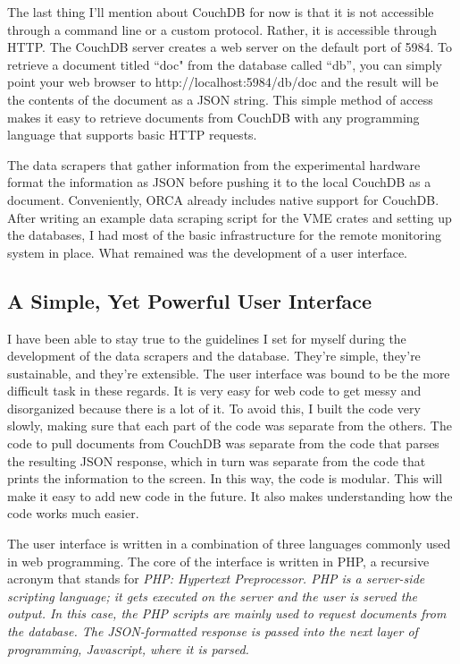 		The last thing I'll mention about CouchDB for now is that it is not accessible through a command line or a custom protocol. Rather, it is accessible through HTTP. The CouchDB server creates a web server on the default port of 5984. To retrieve a document titled ``doc" from the database called ``db'', you can simply point your web browser to http://localhost:5984/db/doc and the result will be the contents of the document as a JSON string. This simple method of access makes it easy to retrieve documents from CouchDB with any programming language that supports basic HTTP requests. 

		The data scrapers that gather information from the experimental hardware format the information as JSON before pushing it to the local CouchDB as a document. Conveniently, ORCA already includes native support for CouchDB. After writing an example data scraping script for the VME crates and setting up the databases, I had most of the basic infrastructure for the remote monitoring system in place. What remained was the development of a user interface.

		\subsection{A Simple, Yet Powerful User Interface}
		I have been able to stay true to the guidelines I set for myself during the development of the data scrapers and the database. They're simple, they're sustainable, and they're extensible. The user interface was bound to be the more difficult task in these regards. It is very easy for web code to get messy and disorganized because there is a lot of it. To avoid this, I built the code very slowly, making sure that each part of the code was separate from the others. The code to pull documents from CouchDB was separate from the code that parses the resulting JSON response, which in turn was separate from the code that prints the information to the screen. In this way, the code is modular. This will make it easy to add new code in the future. It also makes understanding how the code works much easier.

		The user interface is written in a combination of three languages commonly used in web programming. The core of the interface is written in PHP, a recursive acronym that stands for \it PHP: Hypertext Preprocessor\rm. PHP is a server-side scripting language; it gets executed on the server and the user is served the output. In this case, the PHP scripts are mainly used to request documents from the database. The JSON-formatted response is passed into the next layer of programming, Javascript, where it is parsed.

